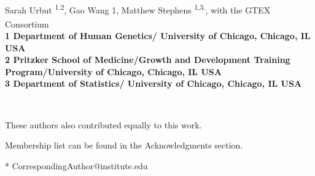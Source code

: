 \documentclass[10pt,letterpaper]{article}
\date{}
\begin{document}
\vspace*{0.35in}

\begin{flushleft}
{\Large
\textbf{}
}
\newline
\\
Sarah Urbut \textsuperscript{1,2},
Gao Wang {1},
Matthew Stephens \textsuperscript{1,3,\ddag},
with the GTEX Consortium\textsuperscript{\textpilcrow}
\\
\bigskip
\bf{1} Department of Human Genetics/ University of Chicago, Chicago, IL USA
\\
\bf{2} Pritzker School of Medicine/Growth and Development Training Program/University of Chicago, Chicago, IL USA
\\
\bf{3} Department of Statistics/ University of Chicago, Chicago, IL USA

\\
\bigskip

% 
%

\ddag These authors also contributed equally to this work.



\textpilcrow Membership list can be found in the Acknowledgments section.

* CorrespondingAuthor@institute.edu

\end{flushleft}
\end{document}
